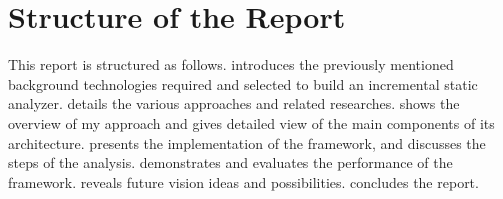 \section{Structure of the Report}

This report is structured as follows.
 introduces the previously mentioned background technologies required and selected to build an incremental static analyzer.
 details the various approaches and related researches.
 shows the overview of my approach and gives detailed view of the main components of its architecture.
 presents the implementation of the framework, and discusses the steps of the analysis.
 demonstrates and evaluates the performance of the framework.
 reveals future vision ideas and possibilities.
 concludes the report.
